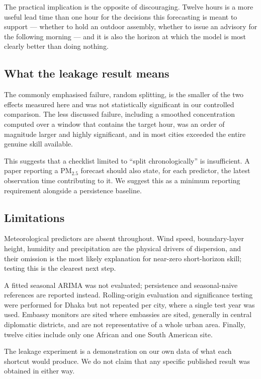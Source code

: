 \documentclass[conference,a4paper]{IEEEtran}
\begin{document}
The practical implication is the opposite of discouraging. Twelve hours is a more
useful lead time than one hour for the decisions this forecasting is meant to
support --- whether to hold an outdoor assembly, whether to issue an advisory for
the following morning --- and it is also the horizon at which the model is most
clearly better than doing nothing.

\subsection{What the leakage result means}
The commonly emphasised failure, random splitting, is the smaller of the two
effects measured here and was not statistically significant in our controlled
comparison. The less discussed failure, including a smoothed concentration
computed over a window that contains the target hour, was an order of magnitude
larger and highly significant, and in most cities exceeded the entire genuine
skill available.

This suggests that a checklist limited to ``split chronologically'' is
insufficient. A paper reporting a PM$_{2.5}$ forecast should also state, for each
predictor, the latest observation time contributing to it. We suggest this as a
minimum reporting requirement alongside a persistence baseline.

\subsection{Limitations}
Meteorological predictors are absent throughout. Wind speed, boundary-layer
height, humidity and precipitation are the physical drivers of dispersion, and
their omission is the most likely explanation for near-zero short-horizon skill;
testing this is the clearest next step.

A fitted seasonal ARIMA was not evaluated; persistence and seasonal-naive
references are reported instead. Rolling-origin evaluation and significance
testing were performed for Dhaka but not repeated per city, where a single test
year was used. Embassy monitors are sited where embassies are sited, generally in
central diplomatic districts, and are not representative of a whole urban area.
Finally, twelve cities include only one African and one South American site.

The leakage experiment is a demonstration on our own data of what each shortcut
would produce. We do not claim that any specific published result was obtained in
either way.
\end{document}
